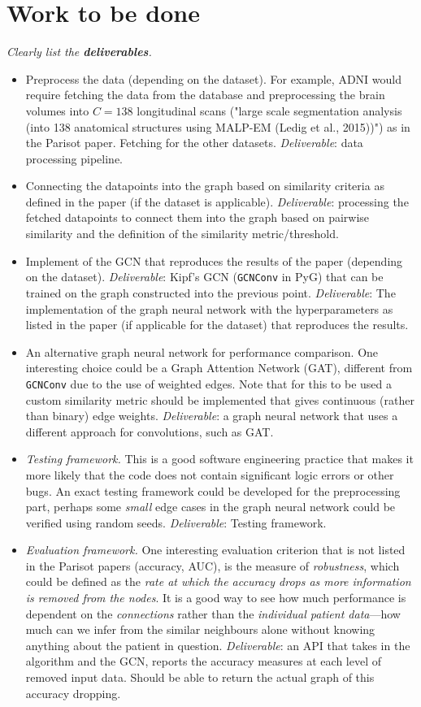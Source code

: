 \documentclass[12pt,a4paper,twoside]{article}
\begin{document}
\section*{Work to be done}
\label{section:work}

\textit{Clearly list the \textbf{deliverables}.}
\begin{itemize}
  \item Preprocess the data (depending on the dataset). For example, ADNI would require fetching the data from the database and preprocessing the brain volumes into $C=138$ longitudinal scans ("large scale segmentation analysis (into 138 anatomical structures using MALP-EM (Ledig et al., 2015))") as in the Parisot paper. Fetching for the other datasets. \textit{Deliverable}: data processing pipeline.
  \item Connecting the datapoints into the graph based on similarity criteria as defined in the paper (if the dataset is applicable). \textit{Deliverable}: processing the fetched datapoints to connect them into the graph based on pairwise similarity and the definition of the similarity metric/threshold.
  \item Implement of the GCN that reproduces the results of the paper (depending on the dataset). \textit{Deliverable}: Kipf's GCN (\texttt{GCNConv} in PyG) that can be trained on the graph constructed into the previous point. \textit{Deliverable}: The implementation of the graph neural network with the hyperparameters as listed in the paper (if applicable for the dataset) that reproduces the results.
  \item An alternative graph neural network for performance comparison. One interesting choice could be a Graph Attention Network (GAT), different from \texttt{GCNConv} due to the use of weighted edges. Note that for this to be used a custom similarity metric should be implemented that gives continuous (rather than binary) edge weights. \textit{Deliverable}: a graph neural network that uses a different approach for convolutions, such as GAT.
  \item \textit{Testing framework.} This is a good software engineering practice that makes it more likely that the code does not contain significant logic errors or other bugs. An exact testing framework could be developed for the preprocessing part, perhaps some \textit{small} edge cases in the graph neural network could be verified using random seeds. \textit{Deliverable}: Testing framework.
  \item \textit{Evaluation framework.} One interesting evaluation criterion that is not listed in the Parisot papers (accuracy, AUC), is the measure of \textit{robustness}, which could be defined as the \textit{rate at which the accuracy drops as more information is removed from the nodes}. It is a good way to see how much performance is dependent on the \textit{connections} rather than the \textit{individual patient data}—how much can we infer from the similar neighbours alone without knowing anything about the patient in question. \textit{Deliverable}: an API that takes in the algorithm and the GCN, reports the accuracy measures at each level of removed input data. Should be able to return the actual graph of this accuracy dropping.

\end{itemize}
\end{document}
